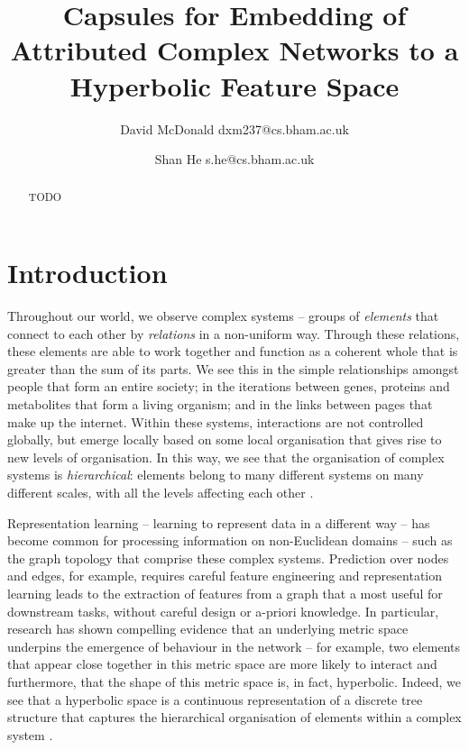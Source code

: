 \documentclass{IEEEtran}
\title{Capsules for Embedding of Attributed Complex Networks to a Hyperbolic Feature Space}
\author{David McDonald dxm237@cs.bham.ac.uk \and Shan He s.he@cs.bham.ac.uk}
\date{}
\begin{document}
	
	\maketitle
	
	\begin{abstract}
		TODO
	\end{abstract}
	
	\section{Introduction}
	
	Throughout our world, we observe complex systems -- groups of \textit{elements} that connect to each other by \textit{relations} in a non-uniform way. 
	Through these relations, these elements are able to work together and function as a coherent whole that is greater than the sum of its parts.
	We see this in the simple relationships amongst people that form an entire society; in the iterations between genes, proteins and metabolites that form a living organism; and in the links between pages that make up the internet.
	Within these systems, interactions are not controlled globally, but emerge locally based on some local organisation that gives rise to new levels of organisation.
	In this way, we see that the organisation of complex systems is \textit{hierarchical}: elements belong to many different systems on many different scales, with all the levels affecting each other \cite{barabasi1999emergence}.   
	
	Representation learning -- learning to represent data in a different way -- has become common for processing information on non-Euclidean domains -- such as the graph topology that comprise these complex systems.  
	Prediction over nodes and edges, for example, requires careful feature engineering \cite{grover2016node2vec} and representation learning leads to the extraction of features from a graph that a most useful for downstream tasks, without careful design or a-priori knowledge.
	In particular, research has shown compelling evidence that an underlying metric space underpins the emergence of behaviour in the network -- for example, two elements that appear close together in this metric space are more likely to interact \cite{grover2016node2vec,alanis2016efficient,alanis2016manifold} and furthermore, that the shape of this metric space is, in fact, hyperbolic.
	Indeed, we see that a hyperbolic space is a continuous representation of a discrete tree structure that captures the hierarchical organisation of elements within a complex system \cite{krioukov2010hyperbolic}.
	
\end{document}
